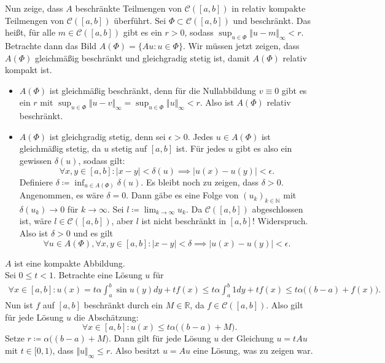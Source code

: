 \documentclass[a4paper]{article}
\theoremstyle{plain}
\begin{document}
Nun zeige, dass $A$ beschränkte Teilmengen von $\mathcal C([a,b])$ in relativ kompakte Teilmengen von $\mathcal C([a,b])$ überführt. Sei $\Phi \subset \mathcal C([a,b])$ und beschränkt. Das heißt, für alle $m \in \mathcal C([a,b])$ gibt es ein $r > 0$, sodass $\sup_{u \in \Phi} \Vert u-m \Vert_\infty < r$. Betrachte dann das Bild $A(\Phi) = \{ Au : u \in \Phi \}$. Wir müssen jetzt zeigen, dass $A(\Phi)$ gleichmäßig beschränkt und gleichgradig stetig ist, damit $A(\Phi)$ relativ kompakt ist.
\begin{itemize}
	\item $A(\Phi)$ ist gleichmäßig beschränkt, denn für die Nullabbildung $v \equiv 0$ gibt es ein $r$ mit $\sup_{u \in \Phi} \Vert u-v \Vert_\infty = \sup_{u \in \Phi} \Vert u \Vert_\infty < r$. Also ist $A(\Phi)$ relativ beschränkt.
	
	\item $A(\Phi)$ ist gleichgradig stetig, denn sei $\epsilon > 0$. Jedes $u \in A(\Phi)$ ist gleichmäßig stetig, da $u$ stetig auf $[a,b]$ ist. Für jedes $u$ gibt es also ein gewissen $\delta(u)$, sodass gilt:
	\[
		\forall x,y \in [a,b]: |x-y| < \delta(u) \implies |u(x)-u(y)| < \epsilon.
	\]
	Definiere $\delta \coloneqq \inf_{u \in A(\Phi)} \delta(u)$. Es bleibt noch zu zeigen, dass $\delta > 0$. Angenommen, es wäre $\delta = 0$. Dann gäbe es eine Folge von $(u_k)_{k \in \mathbb N}$ mit $\delta(u_k) \to 0$ für $k \to \infty$. Sei $l \coloneqq \lim_{k \to \infty}u_k$. Da $\mathcal C([a,b])$ abgeschlossen ist, wäre $l \in \mathcal C([a,b])$, aber $l$ ist nicht beschränkt in $[a,b]$! Widerspruch. Also ist $\delta > 0$ und es gilt
	\[
		\forall u \in A(\Phi), \forall x,y \in [a,b]: \vert x-y \vert < \delta \implies |u(x)-u(y)| < \epsilon.
	\]
\end{itemize}
$A$ ist eine kompakte Abbildung.\\

Sei $0 \leq t < 1$. Betrachte eine Lösung $u$ für
\begin{align*}
	\forall x \in [a,b]: u(x) = t\alpha \int^b_a \sin u(y) dy +tf(x) \leq t\alpha\int^b_a 1dy+ tf(x) \leq t\alpha\Big((b-a)+f(x)\Big).
\end{align*}
Nun ist $f$ auf $[a,b]$ beschränkt durch ein $M \in \mathbb R$, da $f \in \mathcal C([a,b])$. Also gilt für jede Lösung $u$ die Abschätzung:
\[
	\forall x\in [a,b]: u(x) \leq t\alpha\Big((b-a)+M \Big).
\]
Setze $r \coloneqq \alpha\Big((b-a)+M \Big)$. Dann gilt für jede Lösung $u$ der Gleichung $u = tAu$ mit $t \in [0,1)$, dass $\Vert u \Vert_{\infty} \leq r$. Also besitzt  $u = Au$ eine Lösung, was zu zeigen war.
\end{document}
